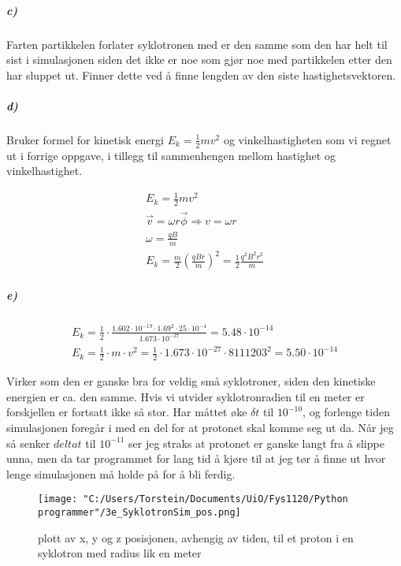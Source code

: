 \documentclass[11pt, A4paper,norsk]{article}
\begin{document}
			\subparagraph{c)}
				\begin{flushleft}
Farten partikkelen forlater syklotronen med er den samme som den har helt til sist i simulasjonen siden det ikke er noe som gjør noe med partikkelen etter den har sluppet ut. Finner dette ved å finne lengden av den siste hastighetsvektoren.
				\end{flushleft}
	
	
	
	
	
	
	
	
	
			\subparagraph{d)}
				\begin{flushleft}
Bruker formel for kinetisk energi $E_k = \frac{1}{2}mv^2$ og vinkelhastigheten som vi regnet ut i forrige oppgave, i tillegg til sammenhengen mellom hastighet og vinkelhastighet.
				\end{flushleft}
				\begin{align}
E_k = \frac{1}{2}mv^2 \\
\vec{v} = \omega r \vec{\phi} \Rightarrow v = \omega r \\
\omega = \frac{qB}{m} \\
E_k = \frac{m}{2} \left( \frac{qBr}{m} \right)^2 = \frac{1}{2} \frac{q^2 B^2 r^2}{m}
				\end{align}











			\subparagraph{e)}
				\begin{align}
E_k = \frac{1}{2} \cdot \frac{1.602 \cdot 10^{-19} \cdot 1.69^2 \cdot 25 \cdot 10^{-4}}{1.673 \cdot 10^{-27}} = 5.48 \cdot 10^{-14} \\
E_k = \frac{1}{2} \cdot m \cdot v^2 = \frac{1}{2} \cdot 1.673 \cdot 10^{-27} \cdot 8111203^2 = 5.50 \cdot 10^{-14}
				\end{align}	
				\begin{flushleft}
Virker som den er ganske bra for veldig små syklotroner, siden den kinetiske energien er ca. den samme.
Hvis vi utvider syklotronradien til en meter er forskjellen er fortsatt ikke så stor. Har måttet øke $\delta t$ til $10^{-10}$, og forlenge tiden simulasjonen foregår i med en del for at protonet skal komme seg ut da. Når jeg så senker $delta t$ til $10^{-11}$ ser jeg straks at protonet er ganske langt fra å slippe unna, men da tar programmet for lang tid å kjøre til at jeg tør å finne ut hvor lenge simulasjonen må holde på for å bli ferdig.
				\end{flushleft}
				\begin{figure}
\texttt{[image: "C:/Users/Torstein/Documents/UiO/Fys1120/Python programmer"/3e\_SyklotronSim\_pos.png]}
\caption{plott av x, y og z posisjonen, avhengig av tiden, til et proton i en syklotron med radius lik en meter}
				\end{figure}
\clearpage

\end{document}
